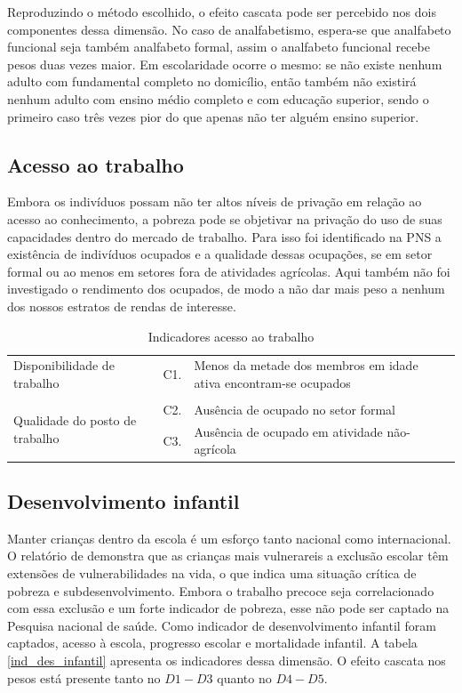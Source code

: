 \documentclass[
	12pt,				%
	openright,			%
	twoside,			%
	a4paper,			%
	english,			%
	french,				%
	spanish,			%
	brazil				%
	]{abntex2}
\begin{document}
Reproduzindo o método escolhido, o efeito cascata pode ser percebido nos dois componentes dessa dimensão. No caso de analfabetismo, espera-se que analfabeto funcional seja também analfabeto formal, assim o analfabeto funcional recebe pesos duas vezes maior. Em escolaridade ocorre o mesmo: se não existe nenhum adulto com fundamental completo no domicílio, então também não existirá nenhum adulto com ensino médio completo e com educação superior, sendo o primeiro caso três vezes pior do que apenas não ter alguém ensino superior.   
 
  \subsection{Acesso ao trabalho}
  Embora os indivíduos possam não ter altos níveis de privação em relação ao acesso ao conhecimento, a pobreza pode se objetivar na privação do uso de suas capacidades dentro do mercado de trabalho. Para isso foi identificado na PNS a existência de indivíduos ocupados e a qualidade dessas ocupações, se em setor formal ou ao menos em setores fora de atividades agrícolas. Aqui também não foi investigado o rendimento dos ocupados, de modo a não dar mais peso a nenhum dos nossos estratos de rendas de interesse.  
  

	    \begin{table}[H]
	  	\footnotesize
	  	\centering
	  	\caption{Indicadores acesso ao trabalho}
	  	\label{ind_laboral}
	  	\begin{tabular}{lll}
	  		\hline
	  		Disponibilidade de trabalho                     & C1. & Menos da metade dos membros em idade ativa encontram-se ocupados \\
	  		&     &                                                                  \\
	  		\multirow{2}{*}{Qualidade do posto de trabalho} & C2. & Ausência de ocupado no setor formal                              \\
	  		& C3. & Ausência de ocupado em atividade não-agrícola                    \\ \hline
	  	\end{tabular}
	  \end{table}
  
  \subsection{Desenvolvimento infantil}
  Manter crianças dentro da escola é um esforço tanto nacional como internacional. O relatório de  demonstra que as crianças mais vulnerareis a exclusão escolar têm extensões de vulnerabilidades na vida, o que indica uma situação crítica de pobreza e subdesenvolvimento. Embora o trabalho precoce seja correlacionado com essa exclusão e um forte indicador de pobreza, esse não pode ser captado na Pesquisa nacional de saúde. Como indicador de desenvolvimento infantil foram captados, acesso à escola, progresso escolar e mortalidade infantil. A tabela \ref{ind_des_infantil} apresenta os indicadores dessa dimensão. O efeito cascata nos pesos está presente tanto no  $D1-D3$ quanto no $D4-D5$.
  
\end{document}

